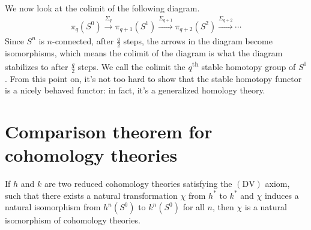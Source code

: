 We now look at the colimit of the following diagram.
\begin{align*}
  \pi_q(S^0) \xrightarrow{\Sigma_q} \pi_{q+1}(S^1) \xrightarrow{\Sigma_{q+1}} \pi_{q+2}(S^2) \xrightarrow{\Sigma_{q+2}} \cdots
\end{align*}
Since $S^n$ is $n$-connected, after $\frac{q}{2}$ steps, the arrows in the diagram become
isomorphisms, which means the colimit of the diagram is what the diagram stabilizes to after
$\frac{q}{2}$ steps. We call the colimit the $q$\textsuperscript{th} stable homotopy group of
$S^0$. From this point on, it's not too hard to show that the stable homotopy functor is a nicely
behaved functor: in fact, it's a generalized homology theory.
  
\section{Comparison theorem for cohomology theories}
\label{sec:comp-theor-cohom}

\begin{thm}
  If $h$ and $k$ are two reduced cohomology theories satisfying the $(\mathrm{DV})$ axiom, such that
  there exists a natural transformation $\chi$ from $h^{\ast}$ to $k^{\ast}$ and $\chi$ induces a
  natural isomorphism from $h^n(S^0)$ to $k^n(S^0)$ for all $n$, then $\chi$ is a natural
  isomorphism of cohomology theories.
\end{thm}

